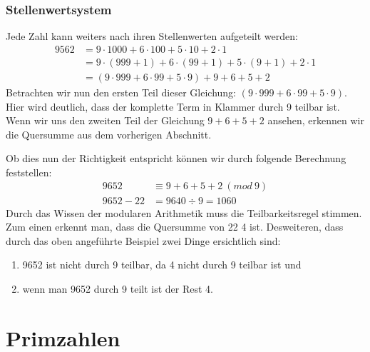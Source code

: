 \documentclass[german,12pt,a4paper]{article}
\begin{document}
\subsubsection{Stellenwertsystem}
Jede Zahl kann weiters nach ihren Stellenwerten aufgeteilt werden:
\begin{align}
9562 &= 9 \cdot 1000 + 6 \cdot 100 + 5 \cdot 10 + 2 \cdot 1 \\
&= 9 \cdot (999+1) + 6 \cdot (99+1) + 5 \cdot (9+1) + 2 \cdot 1 \\
&= (9 \cdot 999 + 6 \cdot 99 + 5 \cdot 9) + 9 + 6 + 5 + 2
\end{align}
Betrachten wir nun den ersten Teil dieser Gleichung: $(9 \cdot 999 + 6 \cdot 99 + 5 \cdot 9)$.
Hier wird deutlich, dass der komplette Term in Klammer durch 9 teilbar ist.
Wenn wir uns den zweiten Teil der Gleichung $9 + 6 + 5 + 2$ ansehen, erkennen wir die Quersumme aus dem vorherigen Abschnitt.

Ob dies nun der Richtigkeit entspricht können wir durch folgende Berechnung feststellen:
\begin{align}
9652      &\equiv 9 + 6 + 5 + 2\ (mod\ 9) \\
9652 - 22 &= 9640 \div 9 = 1060
\end{align}
Durch das Wissen der modularen Arithmetik muss die Teilbarkeitsregel stimmen.
Zum einen erkennt man, dass die Quersumme von 22 4 ist.
Desweiteren, dass  durch das oben angeführte Beispiel zwei Dinge ersichtlich sind:
\begin{enumerate}
    \item 9652 ist nicht durch 9 teilbar, da 4 nicht durch 9 teilbar ist und
    \item wenn man 9652 durch 9 teilt ist der Rest 4.
\end{enumerate}

\newpage
\section{Primzahlen}\label{Primzahlen}
\end{document}
